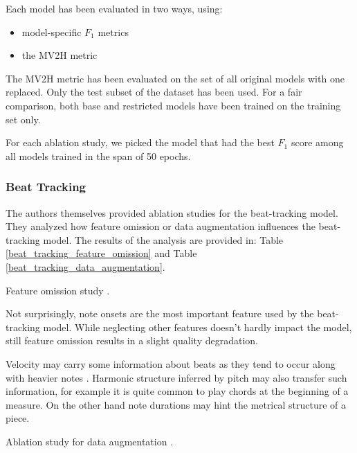 Each model has been evaluated in two ways, using: \begin{itemize}
	\item model-specific $F_1$ metrics
	\item the MV2H metric
\end{itemize}

The MV2H metric has been evaluated on the set of all original models with one replaced. Only the test subset of the dataset has been used. For a fair comparison, both base and restricted models have been trained on the training set only.

For each ablation study, we picked the model that had the best $F_1$ score among all models trained in the span of 50 epochs.

\subsubsection{Beat Tracking} \label{beat_tracking}

The authors themselves provided ablation studies for the beat-tracking model. They analyzed how feature omission or data augmentation influences the beat-tracking model. The results of the analysis are provided in: Table \ref{beat_tracking_feature_omission} and Table \ref{beat_tracking_data_augmentation}.

\begin{table}[ht!]
\centering

\caption[Feature omission study]{Feature omission study \cite{Liu2022}.}
\label{beat_tracking_feature_omission}
\end{table}

Not surprisingly, note onsets are the most important feature used by the beat-tracking model. While neglecting other features doesn't hardly impact the model, still feature omission results in a slight quality degradation.

Velocity may carry some information about beats as they tend to occur along with heavier notes \cite{Liu2022}. Harmonic structure inferred by pitch may also transfer such information, for example it is quite common to play chords at the beginning of a measure. On the other hand note durations may hint the metrical structure of a piece.

\begin{table}[ht!]
\centering

\caption[Ablation study for data augmentation]{Ablation study for data augmentation \cite{Liu2022}.}
\label{beat_tracking_data_augmentation}
\end{table}



